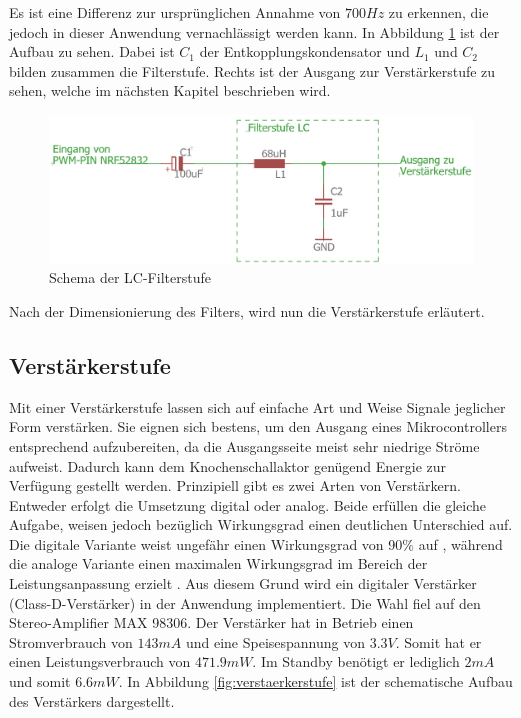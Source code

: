 Es ist eine Differenz zur ursprünglichen Annahme von $700 Hz$ zu erkennen, die jedoch in dieser Anwendung vernachlässigt werden kann. In Abbildung \ref{fig:Filterstufe} ist der Aufbau zu sehen. Dabei ist $C_{1}$ der Entkopplungskondensator und $L_{1}$ und $C_{2}$ bilden zusammen die Filterstufe. Rechts ist der Ausgang zur Verstärkerstufe zu sehen, welche im nächsten Kapitel beschrieben wird.


\begin{figure}[H]
	\begin{center}
		\includegraphics[width=120mm]{data/Schema_Filterstufe.png}
		\caption[Schema der LC-Filterstufe]{Schema der LC-Filterstufe}
		\label{fig:Filterstufe}
	\end{center}
\end{figure}

Nach der Dimensionierung des Filters, wird nun die Verstärkerstufe erläutert.

\subsection{Verstärkerstufe} \label{sec:verstaerkerstufe}
Mit einer Verstärkerstufe lassen sich auf einfache Art und Weise Signale jeglicher Form verstärken. Sie eignen sich bestens, um den Ausgang eines Mikrocontrollers entsprechend aufzubereiten, da die Ausgangsseite meist sehr niedrige Ströme aufweist. Dadurch kann dem Knochenschallaktor genügend Energie zur Verfügung gestellt werden. Prinzipiell gibt es zwei Arten von Verstärkern. Entweder erfolgt die Umsetzung digital oder analog. Beide erfüllen die gleiche Aufgabe, weisen jedoch bezüglich Wirkungsgrad einen deutlichen Unterschied auf. Die digitale Variante weist ungefähr einen Wirkungsgrad von 90$\%$ auf \cite{BoneConductorAdafruit}, während die analoge Variante einen maximalen Wirkungsgrad im Bereich der Leistungsanpassung erzielt \cite{Niklaus_Skript}. Aus diesem Grund wird ein digitaler Verstärker (Class-D-Verstärker) in der Anwendung implementiert. Die Wahl fiel auf den Stereo-Amplifier MAX 98306. Der Verstärker hat in Betrieb einen Stromverbrauch von $143mA$ und eine Speisespannung von $3.3V$. Somit hat er einen Leistungsverbrauch von $471.9 mW$. Im Standby benötigt er lediglich $2 mA$ und somit $6.6 mW$\cite{Verstaerker}. In Abbildung \ref{fig:verstaerkerstufe} ist der schematische Aufbau des Verstärkers dargestellt.

